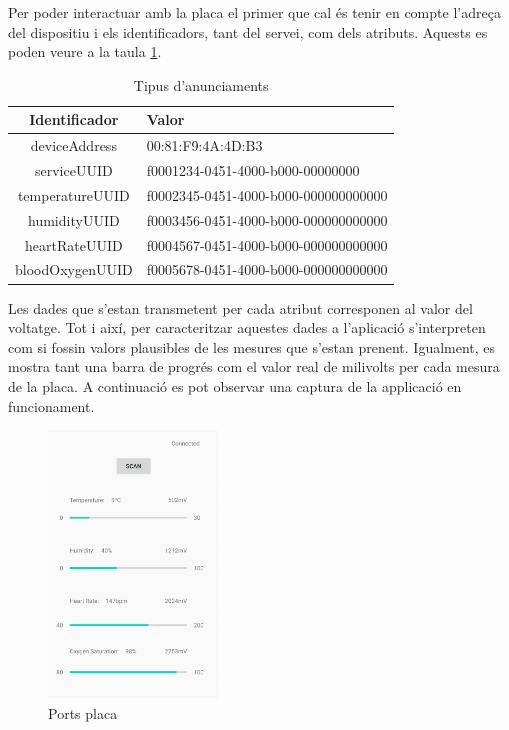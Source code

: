 Per poder interactuar amb la placa el primer que cal és tenir en compte l'adreça del dispositiu i els identificadors, tant del servei, com dels atributs.
Aquests es poden veure a la taula \ref{taula_app}.

\begin{table}[!h]
	\begin{center}
		\begin{tabular}{|c|l|}
			\hline
			Identificador	&	Valor	\\	\hline
			deviceAddress	&	00:81:F9:4A:4D:B3	\\	\hline
			serviceUUID		&	f0001234-0451-4000-b000-00000000		\\	\hline
			temperatureUUID	&	f0002345-0451-4000-b000-000000000000	\\	\hline
			humidityUUID	&	f0003456-0451-4000-b000-000000000000	\\	\hline
			heartRateUUID	&	f0004567-0451-4000-b000-000000000000	\\	\hline
			bloodOxygenUUID	&	f0005678-0451-4000-b000-000000000000	\\	\hline
		\end{tabular}
	\end{center}
	\caption{Tipus d'anunciaments}
	\label{taula_app}
\end{table}

Les dades que s'estan transmetent per cada atribut corresponen al valor del voltatge.
Tot i així, per caracteritzar aquestes dades a l'aplicació s'interpreten com si fossin valors plausibles de les mesures que s'estan prenent.
Igualment, es mostra tant una barra de progrés com el valor real de milivolts per cada mesura de la placa.
A continuació es pot observar una captura de la applicació en funcionament.

\begin{figure}[h]
	\begin{center}
		\includegraphics[width=0.4\textwidth]{./images/captura_app.jpg}
		\caption{Ports placa}
	\end{center}
\end{figure}

